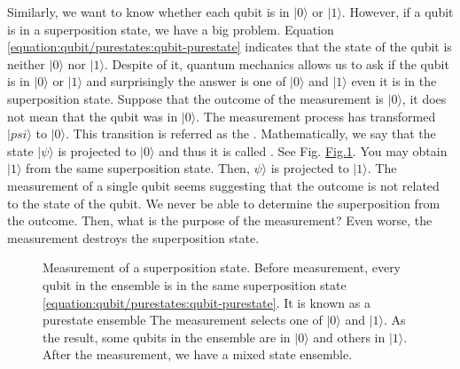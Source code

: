 \documentclass[letterpaper,10pt,english]{jupyterBook}
\let\sphinxpxdimen\pdfpxdimen\else\newdimen\sphinxpxdimen
\begin{document}
\sphinxAtStartPar
Similarly, we want to know whether each qubit is in \(|0\rangle\) or \(|1\rangle\). However, if a qubit is in a superposition state, we have a big problem.  Equation \eqref{equation:qubit/purestates:qubit-purestate} indicates that the state of the qubit is neither \(|0\rangle\) nor \(|1\rangle\).  Despite of it, quantum mechanics allows us to ask if the qubit is in \(|0\rangle\) or \(|1\rangle\) and surprisingly the answer is one of \(|0\rangle\) and \(|1\rangle\) even it is in the superposition state. Suppose that the outcome of the measurement is \(|0\rangle\), it does not mean that the qubit was in \(|0\rangle\).  The measurement process has transformed \(|psi\rangle\) to \(|0\rangle\). This transition is referred as the . Mathematically, we say that the state \(|\psi\rangle\) is projected to \(|0\rangle\) and thus it is called . See Fig. \hyperref[\detokenize{qubit/measurement:measurement-purestate}]{Fig.\@ \ref{\detokenize{qubit/measurement:measurement-purestate}}}.   You may obtain \(|1\rangle\) from the same superposition state. Then, \(\psi\rangle\) is projected to \(|1\rangle\). The measurement of a single qubit seems suggesting that the outcome is not related to the state of the qubit. We never be able to determine the superposition from the outcome. Then, what is the purpose of the measurement?   Even worse, the measurement destroys the superposition state.

\begin{figure}[htbp]
\centering
\capstart

\noindent\sphinxincludegraphics[width=400\sphinxpxdimen]{{measurement-purestate}.png}
\caption{Measurement of a superposition state.  Before measurement, every qubit in the ensemble is in the same superposition state \eqref{equation:qubit/purestates:qubit-purestate}.  It is known as a purestate ensemble  The measurement selects one of \(|0\rangle\) and \(|1\rangle\).  As the result, some qubits in the ensemble are in \(|0\rangle\) and others in \(|1\rangle\). After the measurement, we have a mixed state ensemble.}\label{\detokenize{qubit/measurement:measurement-purestate}}\end{figure}
\end{document}
